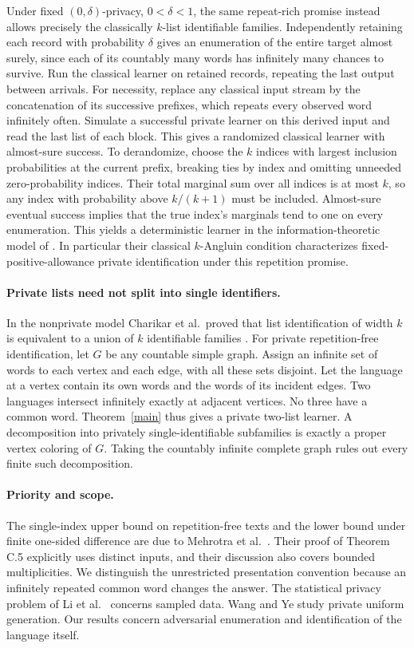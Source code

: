 \documentclass[11pt]{article}
\begin{document}
Under fixed $(0,\delta)$-privacy, $0<\delta<1$, the same repeat-rich promise instead allows precisely the classically $k$-list identifiable families. Independently retaining each record with probability $\delta$ gives an enumeration of the entire target almost surely, since each of its countably many words has infinitely many chances to survive. Run the classical learner on retained records, repeating the last output between arrivals. For necessity, replace any classical input stream by the concatenation of its successive prefixes, which repeats every observed word infinitely often. Simulate a successful private learner on this derived input and read the last list of each block. This gives a randomized classical learner with almost-sure success. To derandomize, choose the $k$ indices with largest inclusion probabilities at the current prefix, breaking ties by index and omitting unneeded zero-probability indices. Their total marginal sum over all indices is at most $k$, so any index with probability above $k/(k+1)$ must be included. Almost-sure eventual success implies that the true index's marginals tend to one on every enumeration. This yields a deterministic learner in the information-theoretic model of \cite{cpt}. In particular their classical $k$-Angluin condition characterizes fixed-positive-allowance private identification under this repetition promise.

\paragraph{Private lists need not split into single identifiers.}
In the nonprivate model Charikar et al.\ proved that list identification of width $k$ is equivalent to a union of $k$ identifiable families \cite[Thm.~2]{cpt}. For private repetition-free identification, let $G$ be any countable simple graph. Assign an infinite set of words to each vertex and each edge, with all these sets disjoint. Let the language at a vertex contain its own words and the words of its incident edges. Two languages intersect infinitely exactly at adjacent vertices. No three have a common word. Theorem~\ref{main} thus gives a private two-list learner. A decomposition into privately single-identifiable subfamilies is exactly a proper vertex coloring of $G$. Taking the countably infinite complete graph rules out every finite such decomposition.

\paragraph{Priority and scope.}
The single-index upper bound on repetition-free texts and the lower bound under finite one-sided difference are due to Mehrotra et al.\ \cite{mv}. Their proof of Theorem C.5 explicitly uses distinct inputs, and their discussion also covers bounded multiplicities. We distinguish the unrestricted presentation convention because an infinitely repeated common word changes the answer. The statistical privacy problem of Li et al.\ \cite{stat} concerns sampled data. Wang and Ye \cite{uniform} study private uniform generation. Our results concern adversarial enumeration and identification of the language itself.
\end{document}
